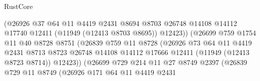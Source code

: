 \begin{lexlean}{RustCore}
\begin{coremodule}
                                    (@26926
                                      @37
                                      @64
                                      @11
                                      @4419
                                      @2431
                                      @8694
                                      @8703
                                      @26748
                                      @14108
                                      @14112
                                      @17740
                                      @12411
                                      (@11949 (@12413 @8703 @8695))
                                      @12423))
                                  (@26699
                                    @759
                                    @1754
                                    @11
                                    @40
                                    @8728
                                    @8751
                                    (@26839
                                      @759
                                      @11
                                      @8728
                                      (@26926
                                        @73
                                        @64
                                        @11
                                        @4419
                                        @2431
                                        @8713
                                        @8723
                                        @26748
                                        @14108
                                        @14112
                                        @17666
                                        @12411
                                        (@11949 (@12413 @8723 @8714))
                                        @12423))
                                    (@26699
                                      @729
                                      @214
                                      @11
                                      @27
                                      @8749
                                      @2397
                                      (@26839
                                        @729
                                        @11
                                        @8749
                                        (@26926
                                          @171
                                          @64
                                          @11
                                          @4419
                                          @2431

\end{coremodule}
\end{lexlean}
